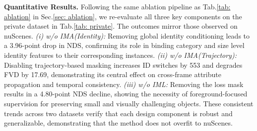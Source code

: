 \textbf{Quantitative Results.}
Following the same ablation pipeline as Tab.\ref{tab: ablation} in Sec.\ref{sec: ablation}, we re-evaluate all three key components on the private dataset in Tab.\ref{tab: private}.  
The outcomes mirror those observed on nuScenes.
\textit{(i) w/o IMA(Identity): } Removing global identity conditioning leads to a 3.96-point drop in NDS, confirming its role in binding category and size level identity features to their corresponding instances.
\textit{(ii) w/o IMA(Trajectory):} Disabling trajectory-based masking increases ID switches by 553 and degrades FVD by 17.69, demonstrating its central effect on cross-frame attribute propagation and temporal consistency.
\textit{(iii) w/o IML:} Removing the loss mask results in a 4.80-point NDS decline, showing the necessity of foreground-focused supervision for preserving small and visually challenging objects.
These consistent trends across two datasets verify that each design component is robust and generalizable, demonstrating that the method does not overfit to nuScenes.





\begin{table}[htbp]
    \centering
    \footnotesize
        \centering
        \caption{Ablation study results on the \textbf{Private Dataset} validation set.}
        \label{tab: private}
\end{table}



